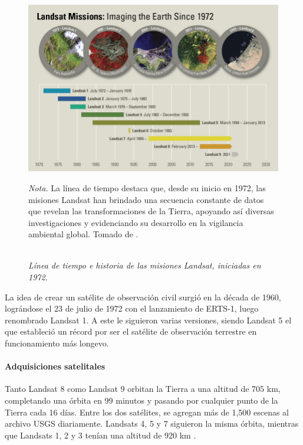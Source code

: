                     \begin{figure}[H] 
                        \caption{\doublespacing \\ \textit{Línea de tiempo e historia de las misiones Landsat, iniciadas en 1972.}} 
                        \centering
                        \includegraphics[width=1\linewidth]{2_CAPITULO0/IMG/linea_tiempo_landsat.png}
                        \begin{justify}
                            \textit{Nota.} La línea de tiempo destaca que, desde su inicio en 1972, las misiones Landsat han brindado una secuencia constante de datos que revelan las transformaciones de la Tierra, apoyando así diversas investigaciones y evidenciando su desarrollo en la vigilancia ambiental global. Tomado de \textcite{USGS2023}.
                        \end{justify}                    
                        \label{landsat_missions}
                    \end{figure}



                    La idea de crear un satélite de observación civil surgió en la década de 1960, lográndose el 23 de julio de 1972 con el lanzamiento de ERTS-1, luego renombrado Landsat 1. A este le siguieron varias versiones, siendo Landsat 5 el que estableció un récord por ser el satélite de observación terrestre en funcionamiento más longevo.
                
                \paragraph{Adquisiciones satelitales}
                    Tanto Landsat 8 como Landsat 9 orbitan la Tierra a una altitud de 705 km, completando una órbita en 99 minutos y pasando por cualquier punto de la Tierra cada 16 días. Entre los dos satélites, se agregan más de 1,500 escenas al archivo USGS diariamente. Landsats 4, 5 y 7 siguieron la misma órbita, mientras que Landsats 1, 2 y 3 tenían una altitud de 920 km \autocite{USGS2023}.
                

